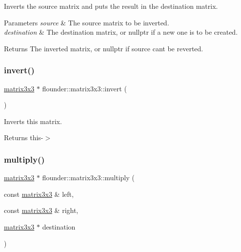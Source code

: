Inverts the source matrix and puts the result in the destination matrix. 


\begin{DoxyParams}{Parameters}
{\em source} & The source matrix to be inverted. \\
\hline
{\em destination} & The destination matrix, or nullptr if a new one is to be created. \\
\hline
\end{DoxyParams}
\begin{DoxyReturn}{Returns}
The inverted matrix, or nullptr if source can\textquotesingle{}t be reverted. 
\end{DoxyReturn}
\mbox{\label{classflounder_1_1matrix3x3_add38efb997787cf7e335ad35f8f34311}} 
\subsubsection{\texorpdfstring{invert()}{invert()}\hspace{0.1cm}{\footnotesize\ttfamily [2/2]}}
{\footnotesize\ttfamily \hyperlink{classflounder_1_1matrix3x3}{matrix3x3} $\ast$ flounder\+::matrix3x3\+::invert (\begin{DoxyParamCaption}{ }\end{DoxyParamCaption})}



Inverts this matrix. 

\begin{DoxyReturn}{Returns}
this-\/$>$ 
\end{DoxyReturn}
\mbox{\label{classflounder_1_1matrix3x3_a7c46f7546804f85fc8d8c55f39c044fd}} 
\subsubsection{\texorpdfstring{multiply()}{multiply()}}
{\footnotesize\ttfamily \hyperlink{classflounder_1_1matrix3x3}{matrix3x3} $\ast$ flounder\+::matrix3x3\+::multiply (\begin{DoxyParamCaption}\item[{const \hyperlink{classflounder_1_1matrix3x3}{matrix3x3} \&}]{left,  }\item[{const \hyperlink{classflounder_1_1matrix3x3}{matrix3x3} \&}]{right,  }\item[{\hyperlink{classflounder_1_1matrix3x3}{matrix3x3} $\ast$}]{destination }\end{DoxyParamCaption})\hspace{0.3cm}{\ttfamily [static]}}



